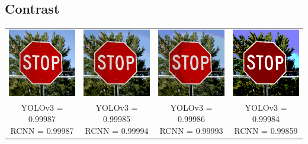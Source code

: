 \documentclass{article}
\begin{document}
\subsection{Contrast}
\begin{center}
\begin{tabular}{ c c c c }
    \includegraphics[width=0.2\linewidth]{../test_images/stop.png} & \includegraphics[width=0.2\linewidth]{../test_images/perturbed/stop_contrast_0_050.png} & \includegraphics[width=0.2\linewidth]{../test_images/perturbed/stop_contrast_0_025.png} & \includegraphics[width=0.2\linewidth]{../test_images/perturbed/stop_contrast_0_010.png} \\
    \makecell{YOLOv3 = 0.99987 \\ RCNN = 0.99987} & \makecell{YOLOv3 = 0.99985 \\ RCNN = 0.99994} & \makecell{YOLOv3 = 0.99986 \\ RCNN = 0.99993} & \makecell{YOLOv3 = 0.99984 \\ RCNN = 0.99859} \\  

\end{tabular}
\end{center}
\end{document}
